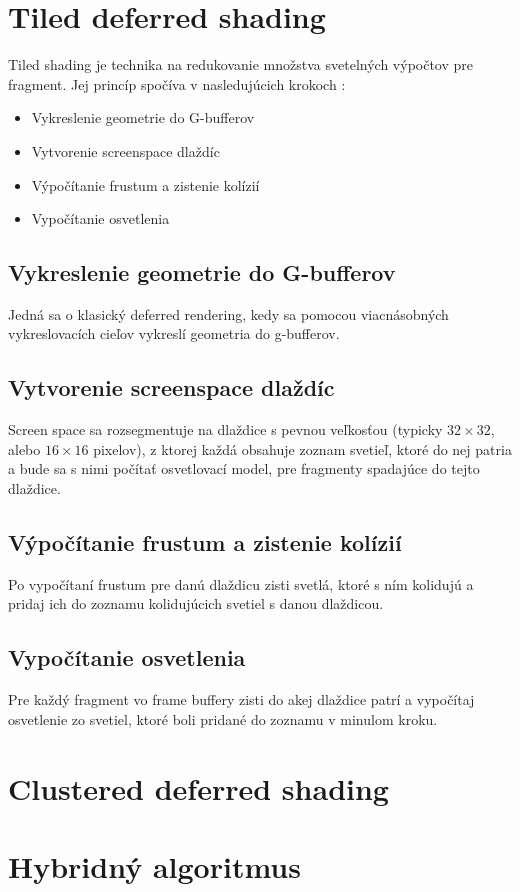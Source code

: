 \section{Tiled deferred shading}
Tiled shading je technika na redukovanie množstva svetelných výpočtov pre fragment. Jej princíp spočíva v nasledujúcich krokoch \cite{tiled-shading}:
\begin{itemize}
	\item Vykreslenie geometrie do G-bufferov
	\item Vytvorenie screenspace dlaždíc 
	\item Výpočítanie frustum a zistenie kolízií
	\item Vypočítanie osvetlenia
\end{itemize}

\subsection*{Vykreslenie geometrie do G-bufferov}
Jedná sa o klasický deferred rendering, kedy sa pomocou viacnásobných vykreslovacích cieľov vykreslí geometria do g-bufferov.

\subsection*{Vytvorenie screenspace dlaždíc}
Screen space sa rozsegmentuje na dlaždice s pevnou veľkosťou (typicky $32 \times 32$, alebo $16 \times 16$ pixelov), z ktorej každá obsahuje zoznam svetieľ, ktoré do nej patria a bude sa s nimi počítať osvetlovací model, pre fragmenty spadajúce do tejto dlaždice.

\subsection*{Výpočítanie frustum a zistenie kolízií}
Po vypočítaní frustum pre danú dlaždicu zisti svetlá, ktoré s ním kolidujú a pridaj ich do zoznamu kolidujúcich svetiel s danou dlaždicou.

\subsection*{Vypočítanie osvetlenia}
Pre každý fragment vo frame buffery zisti do akej dlaždice patrí a vypočítaj osvetlenie zo svetiel, ktoré boli pridané do zoznamu v minulom kroku.

\section{Clustered deferred shading}

\section{Hybridný algoritmus}
\label{hybrid}

